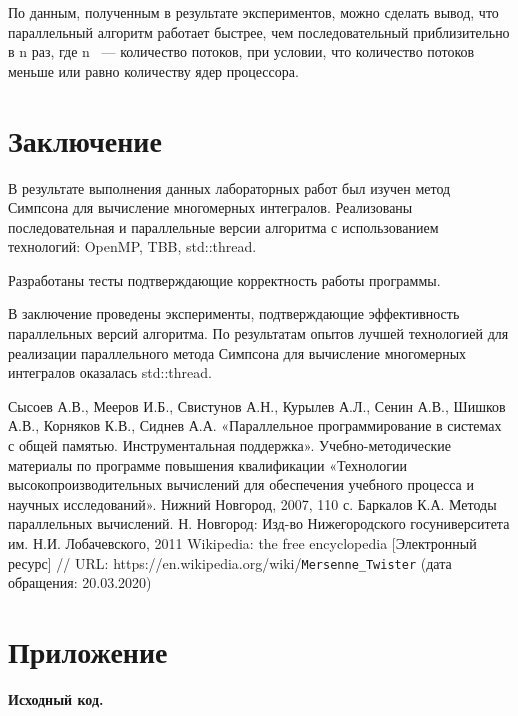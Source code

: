 \documentclass{report}
\begin{document}
\par По данным, полученным в результате экспериментов, можно сделать вывод, что параллельный алгоритм работает быстрее, чем последовательный приблизительно в n раз, где n ~--- количество потоков, при условии, что количество потоков меньше или равно количеству ядер процессора.
\newpage

\section*{Заключение}
В результате выполнения данных лабораторных работ был изучен метод Симпсона для вычисление многомерных интегралов.
Реализованы последовательная и параллельные версии алгоритма с использованием технологий: OpenMP, TBB, std::thread.
\par Разработаны тесты подтверждающие корректность работы программы.
\par В заключение проведены эксперименты, подтверждающие эффективность параллельных версий алгоритма. По результатам опытов лучшей технологией для реализации параллельного метода Симпсона для вычисление многомерных интегралов оказалась std::thread.
\newpage

\begin{thebibliography}{1}
 Сысоев А.В., Мееров И.Б., Свистунов А.Н., Курылев А.Л., Сенин А.В., Шишков А.В., Корняков К.В., Сиднев А.А. «Параллельное программирование в системах с общей памятью. Инструментальная поддержка». Учебно-методические материалы по программе повышения квалификации «Технологии высокопроизводительных вычислений для обеспечения учебного процесса и научных исследований». Нижний Новгород, 2007, 110 с. 
 Баркалов К.А. Методы параллельных вычислений. Н. Новгород: Изд-во Нижегородского госуниверситета им. Н.И. Лобачевского, 2011
 Wikipedia: the free encyclopedia [Электронный ресурс] // URL: https://en.wikipedia.org/wiki/\verb|Mersenne_Twister| (дата обращения: 20.03.2020)
\end{thebibliography}
\newpage

\section*{Приложение}
\centerline{\bfseries Исходный код.} 





\end{document}
